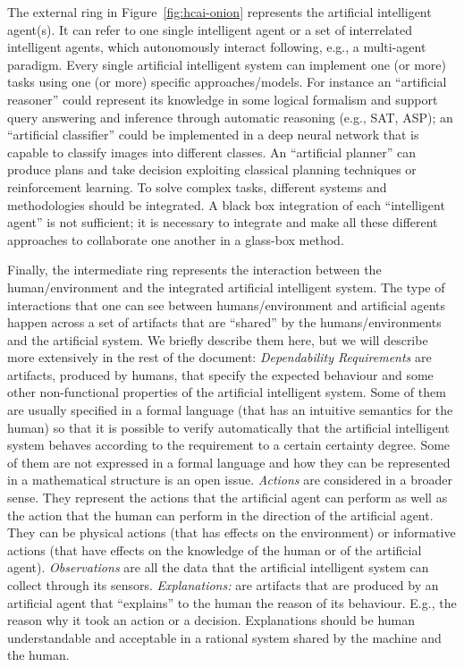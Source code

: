 The external ring in Figure~\ref{fig:hcai-onion} represents the
artificial intelligent agent(s). It can refer to one single
intelligent agent or a set of interrelated intelligent agents, which
autonomously interact following, e.g., a multi-agent paradigm. Every
single artificial intelligent system can implement one (or more) tasks
using one (or more) specific approaches/models. For instance an
``artificial reasoner'' could represent its knowledge in some logical
formalism and support query answering and inference through automatic
reasoning (e.g., SAT, ASP); an ``artificial classifier'' could be
implemented in a deep neural network that is capable to classify
images into different classes. An ``artificial planner'' can produce
plans and take decision exploiting classical planning techniques or
reinforcement learning. To solve complex tasks, different systems and
methodologies should be integrated. A black box integration of each
``intelligent agent'' is not sufficient; it is necessary to integrate
and make all these different approaches to collaborate one another in
a glass-box method. 

Finally, the intermediate ring represents the interaction between the
human/environment and the integrated artificial intelligent system.
The type of interactions that one can see between humans/environment and
artificial agents happen across a set of artifacts that are
``shared'' by the humans/environments and the artificial system.
We briefly describe them here, but we will describe more extensively
in the rest of the document:
\emph{Dependability Requirements} are
artifacts, produced by humans, that specify the expected behaviour and
some other non-functional properties of the artificial intelligent
system. Some of them are usually specified in a formal language (that
has an intuitive semantics for the human) so that it is possible to
verify automatically that the artificial intelligent system behaves
according to the requirement to a certain certainty degree.  Some
of them are not expressed in a formal language and how they can be
represented in a mathematical structure is an open issue.
\emph{Actions} are considered in a broader sense. They
  represent the actions that the artificial agent can perform as well
  as the action that the human can perform in the direction of the
  artificial agent. They can be physical actions (that has effects on
  the environment) or informative actions (that have effects on the
  knowledge of the human or of the artificial agent). 
\emph{Observations} are all the data that the artificial
  intelligent system can collect through its sensors.
\emph{Explanations:} are artifacts that are produced by an artificial
  agent that ``explains'' to the human the reason of its
  behaviour. E.g., the reason why it took an action or a
  decision. Explanations should be human understandable and acceptable
  in a rational system shared by the machine and the human. 


